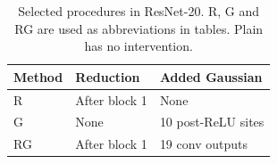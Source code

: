\begin{table}[t]
\caption{Selected procedures in ResNet-20. R, G and RG are used as abbreviations in tables. Plain has no intervention.}
\label{tab:methods}
\centering\small
\begin{tabularx}{\columnwidth}{@{}lXX@{}}
\toprule
Method & Reduction & Added Gaussian\\
\midrule
R & After block 1 & None\\
G & None & 10 post-ReLU sites\\
RG & After block 1 & 19 conv outputs\\
\bottomrule
\end{tabularx}
\end{table}
